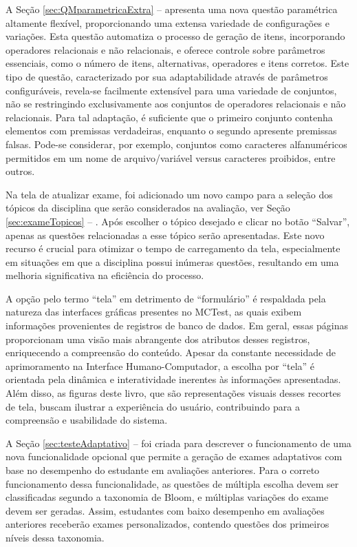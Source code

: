 A Seção \ref{sec:QMparametricaExtra} --  apresenta uma nova questão paramétrica altamente flexível, proporcionando uma extensa variedade de configurações e variações. Esta questão automatiza o processo de geração de itens, incorporando operadores relacionais e não relacionais, e oferece controle sobre parâmetros essenciais, como o número de itens, alternativas, operadores e itens corretos. Este tipo de questão, caracterizado por sua adaptabilidade através de parâmetros configuráveis, revela-se facilmente extensível para uma variedade de conjuntos, não se restringindo exclusivamente aos conjuntos de operadores relacionais e não relacionais. Para tal adaptação, é suficiente que o primeiro conjunto contenha elementos com premissas verdadeiras, enquanto o segundo apresente premissas falsas. Pode-se considerar, por exemplo, conjuntos como caracteres alfanuméricos permitidos em um nome de arquivo/variável versus caracteres proibidos, entre outros.


Na tela de atualizar exame, foi adicionado um novo campo para a seleção dos tópicos da disciplina que serão considerados na avaliação, ver Seção \ref{sec:exameTopicos} -- . Após escolher o tópico desejado e clicar no botão ``Salvar'', apenas as questões relacionadas a esse tópico serão apresentadas. Este novo recurso é crucial para otimizar o tempo de carregamento da tela, especialmente em situações em que a disciplina possui inúmeras questões, resultando em uma melhoria significativa na eficiência do processo.

A opção pelo termo ``tela'' em detrimento de ``formulário'' é respaldada pela natureza das interfaces gráficas presentes no MCTest, as quais exibem informações provenientes de registros de banco de dados. Em geral, essas páginas proporcionam uma visão mais abrangente dos atributos desses registros, enriquecendo a compreensão do conteúdo. Apesar da constante necessidade de aprimoramento na Interface Humano-Computador, a escolha por ``tela'' é orientada pela dinâmica e interatividade inerentes às informações apresentadas. Além disso, as figuras deste livro, que são representações visuais desses recortes de tela, buscam ilustrar a experiência do usuário, contribuindo para a compreensão e usabilidade do sistema.

A Seção \ref{sec:testeAdaptativo} --  foi criada para descrever o funcionamento de uma nova funcionalidade opcional que permite a geração de exames adaptativos com base no desempenho do estudante em avaliações anteriores. Para o correto funcionamento dessa funcionalidade, as questões de múltipla escolha devem ser classificadas segundo a taxonomia de Bloom, e múltiplas variações do exame devem ser geradas. Assim, estudantes com baixo desempenho em avaliações anteriores receberão exames personalizados, contendo questões dos primeiros níveis dessa taxonomia.

